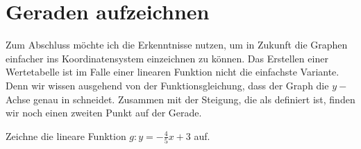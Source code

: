 \documentclass[11pt,oneside]{article}
\begin{document}
\section{Geraden aufzeichnen}
    Zum Abschluss möchte ich die Erkenntnisse nutzen, um in Zukunft die Graphen einfacher ins Koordinatensystem einzeichnen zu können. Das Erstellen einer Wertetabelle ist im Falle einer linearen Funktion nicht die einfachste Variante. Denn wir wissen ausgehend von der Funktionsgleichung, dass der Graph die $y-$Achse genau in  schneidet. Zusammen mit der Steigung, die als  definiert ist, finden wir noch einen zweiten Punkt auf der Gerade.
    \begin{beispiel}
        Zeichne die lineare Funktion $g:y=-\frac{4}{5}x+3$ auf.
        \begin{figure}[H]
            \centering
        \end{figure}
    \end{beispiel}
\end{document}
